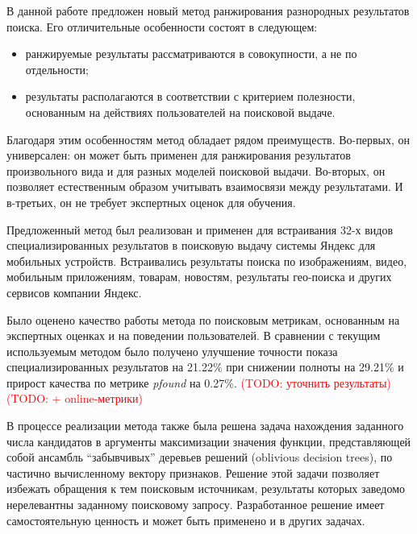 \documentclass[12pt,a4paper]{report}
\newcommand\note[1]{\textcolor{red}{(#1)}}
\newcommand\todonote[1]{\note{TODO: #1}}
\begin{document}
В данной работе предложен новый метод ранжирования разнородных результатов поиска. Его отличительные особенности состоят в следующем:
\begin{itemize}
  \item ранжируемые результаты рассматриваются в совокупности, а не по отдельности;
  \item результаты располагаются в соответствии с критерием полезности, основанным на действиях пользователей на поисковой выдаче. %
\end{itemize}
Благодаря этим особенностям метод обладает рядом преимуществ. Во-первых, он универсален: он может быть применен для ранжирования результатов произвольного вида и для разных моделей поисковой выдачи. Во-вторых, он позволяет естественным образом учитывать взаимосвязи между результатами. И в-третьих, он не требует экспертных оценок для обучения. 


Предложенный метод был реализован и применен для встраивания 32-х видов специализированных результатов в поисковую выдачу системы Яндекс для мобильных устройств. Встраивались результаты поиска по изображениям, видео, мобильным приложениям, товарам, новостям, результаты гео-поиска и других сервисов компании Яндекс. 

Было оценено качество работы метода по поисковым метрикам, основанным на экспертных оценках и на поведении пользователей. В сравнении с текущим используемым методом было получено улучшение точности показа специализированных результатов на 21.22\% при снижении полноты на 29.21\% и прирост качества по метрике \textit{pfound} на 0.27\%. \todonote{уточнить результаты} \todonote{+ online-метрики}

В процессе реализации метода также была решена задача нахождения заданного числа кандидатов в аргументы максимизации значения функции, представляющей собой ансамбль ``забывчивых'' деревьев решений (oblivious decision trees), по частично вычисленному вектору признаков. Решение этой задачи позволяет избежать обращения к тем поисковым источникам, результаты которых заведомо нерелевантны заданному поисковому запросу. Разработанное решение имеет самостоятельную ценность и может быть применено и в других задачах.
\end{document}
